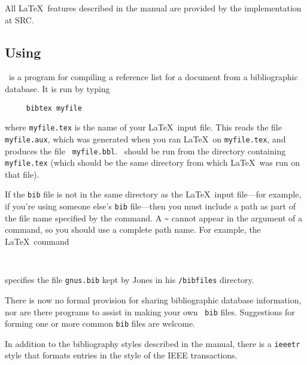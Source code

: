 All \LaTeX\ features described in the manual are provided by 
the implementation at SRC.
 
 
 
 
 
\subsection{Using \BibTeX}
 
\BibTeX\ is a program for compiling a reference list for a document
from a bibliographic database.  It is run by typing
\begin{verbatim}
     bibtex myfile
\end{verbatim}
where \mbox{\tt myfile.tex} is the name of your \LaTeX\ input file.
This reads the file \mbox{\tt myfile.aux}, which was generated when you
ran \LaTeX\ on \mbox{\tt myfile.tex}, and produces the file \mbox{\tt
myfile.bbl}.  \BibTeX\ should be run from the directory containing
\mbox{\tt myfile.tex} (which should be the same directory from which
\LaTeX\ was run on that file).
 
If the {\tt bib} file is not in the same directory as the \LaTeX\ input
file---for example, if you're using someone else's {\tt bib}
file---then you must include a path as part of the file name specified
by the \hbox{\verb||} command.  A \verb|~| cannot appear
in the argument of a \hbox{\verb||} command, so you should
use a complete path name.  For example, the \LaTeX\ command
\begin{verbatim}
     
\end{verbatim}
specifies the file \mbox{\tt gnus.bib} kept by Jones in his 
\mbox{\tt /bibfiles} directory.
 
 
There is now no formal provision for sharing bibliographic database
information, nor are there programs to assist in making your own {\tt
bib} files.  Suggestions for forming one or more common {\tt bib} files
are welcome.
 
In addition to the bibliography styles described in the manual, there
is a {\tt ieeetr} style that formats entries in the style of the IEEE
transactions.
 
